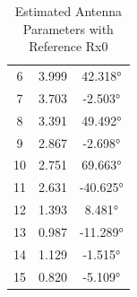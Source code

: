 \begin{table}[h]
\begin{subtable}[t]{0.4\textwidth}
\begin{tabular}{ccc}
      6                & \num{3.999}   & 42.318°        \\
      7                & \num{3.703}   & -2.503°        \\
      8                & \num{3.391}   & 49.492°        \\
      9                & \num{2.867}   & -2.698°        \\
      10               & \num{2.751}   & 69.663°        \\
      11               & \num{2.631}   & -40.625°       \\
      12               & \num{1.393}   & 8.481°         \\
      13               & \num{0.987}   & -11.289°       \\
      14               & \num{1.129}   & -1.515°        \\
      15               & \num{0.820}   & -5.109°        \\
      \bottomrule
    \end{tabular}
    \label{tab:rx_gains}
  \end{subtable}
  \caption{Estimated Antenna Parameters with Reference Rx0}
\end{table}

